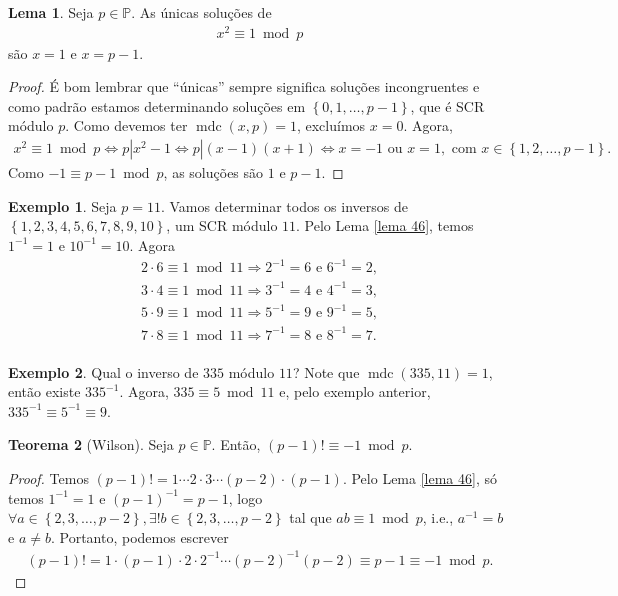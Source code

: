 \documentclass[a4paper,11pt,twoside, leqno]{article}
\DeclareMathOperator{\mdc}{mdc}
\theoremstyle{definition}
\newtheorem{theorem}{Teorema}[section]
\newtheorem{lemma}[theorem]{Lema}
\newtheorem*{example}{Exemplo}
\begin{document}
\begin{lemma}
	\label{lema 46}
	Seja $p\in\mathbb{P}$. As únicas soluções de
	\begin{align*}
	x^2\equiv 1\bmod p
	\end{align*} 
	são $x=1$ e $x = p-1$.
\end{lemma}
\begin{proof}
	É bom lembrar que ``únicas'' sempre significa soluções incongruentes e como padrão estamos determinando soluções em $\left\{ 0,1,\dots,p-1 \right\}$, que é SCR módulo $p$. Como devemos ter $\mdc(x,p) = 1$, excluímos $x=0$. Agora, 
	\begin{align*}
	x^2\equiv 1\bmod p \Leftrightarrow p|x^2 - 1 \Leftrightarrow p|(x-1)(x+1) \Leftrightarrow x=-1 \text{ ou } x = 1, \text{ com } x\in\left\{ 1,2,\dots,p-1 \right\}.
	\end{align*}
	Como $-1\equiv p-1\bmod p$, as soluções são $1$ e $p-1$.
\end{proof}
\begin{example}
	Seja $p=11$. Vamos determinar todos os inversos de $\left\{ 1,2,3,4,5,6,7,8,9,10 \right\}$, um SCR módulo $11$. Pelo Lema \eqref{lema 46}, temos $1^{-1} = 1$ e $10^{-1} = 10$. Agora
	\begin{align*}
	2\cdot 6\equiv 1\bmod 11 \Rightarrow 2^{-1} = 6 \text{ e } 6^{-1} = 2, \\
	3\cdot 4\equiv 1\bmod 11 \Rightarrow 3^{-1} = 4 \text{ e } 4^{-1} = 3, \\
	5\cdot 9\equiv 1\bmod 11 \Rightarrow 5^{-1} = 9 \text{ e } 9^{-1} = 5, \\
	7\cdot 8\equiv 1\bmod 11 \Rightarrow 7^{-1} = 8 \text{ e } 8^{-1} = 7. \\
	\end{align*}
\end{example}
\begin{example}
	Qual o inverso de $335$ módulo $11$? Note que $\mdc(335, 11) = 1$, então existe $335^{-1}$. Agora, $335\equiv 5\bmod 11$ e, pelo exemplo anterior, $335^{-1}\equiv 5^{-1} \equiv 9$.
\end{example}
\begin{theorem}[Wilson]
	Seja $p\in\mathbb{P}$. Então, $(p-1)! \equiv -1\bmod p$.
\end{theorem}
\begin{proof}
	Temos $(p-1)! = 1\cdots 2\cdot 3\cdots (p-2)\cdot(p-1)$. Pelo Lema \eqref{lema 46}, só temos $1^{-1} = 1$ e $(p-1)^{-1} = p-1$, logo $\forall a\in\left\{ 2,3,\dots,p-2 \right\}, \exists!b\in\left\{ 2,3,\dots,p-2 \right\}$ tal que $ab\equiv 1\bmod p$, i.e., $a^{-1} = b$ e $a\neq b$. Portanto, podemos escrever
	\begin{align*}
	(p-1)! = 1\cdot (p-1)\cdot 2\cdot 2^{-1} \cdots (p-2)^{-1}(p-2) \equiv p-1 \equiv -1\bmod p.
	\end{align*}
\end{proof}
\end{document}
